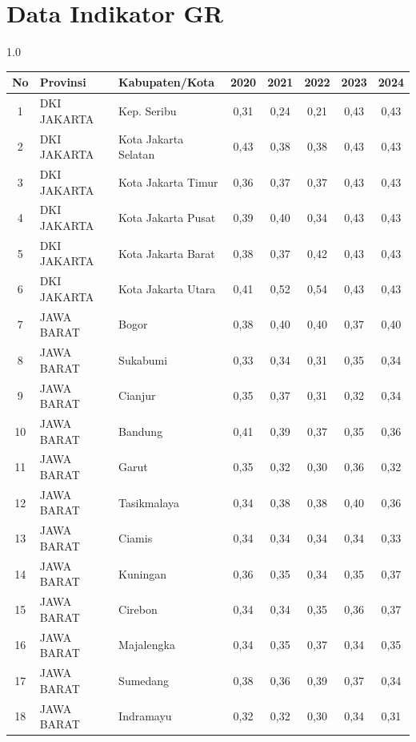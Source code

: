 \section*{Data Indikator GR}
\begin{spacing}{1.0}
\scriptsize
\setlength{\tabcolsep}{2pt}
\begin{longtable}{|c|p{2.2cm}|p{2.8cm}|c|c|c|c|c|}
\hline
\textbf{No} & \textbf{Provinsi} & \textbf{Kabupaten/Kota} & \textbf{2020} & \textbf{2021} & \textbf{2022} & \textbf{2023} & \textbf{2024} \\ \hline
\endhead
1 & DKI JAKARTA & Kep. Seribu & 0,31 & 0,24 & 0,21 & 0,43 & 0,43 \\ \hline
2 & DKI JAKARTA & Kota Jakarta Selatan & 0,43 & 0,38 & 0,38 & 0,43 & 0,43 \\ \hline
3 & DKI JAKARTA & Kota Jakarta Timur & 0,36 & 0,37 & 0,37 & 0,43 & 0,43 \\ \hline
4 & DKI JAKARTA & Kota Jakarta Pusat & 0,39 & 0,40 & 0,34 & 0,43 & 0,43 \\ \hline
5 & DKI JAKARTA & Kota Jakarta Barat & 0,38 & 0,37 & 0,42 & 0,43 & 0,43 \\ \hline
6 & DKI JAKARTA & Kota Jakarta Utara & 0,41 & 0,52 & 0,54 & 0,43 & 0,43 \\ \hline
7 & JAWA BARAT & Bogor & 0,38 & 0,40 & 0,40 & 0,37 & 0,40 \\ \hline
8 & JAWA BARAT & Sukabumi & 0,33 & 0,34 & 0,31 & 0,35 & 0,34 \\ \hline
9 & JAWA BARAT & Cianjur & 0,35 & 0,37 & 0,31 & 0,32 & 0,34 \\ \hline
10 & JAWA BARAT & Bandung & 0,41 & 0,39 & 0,37 & 0,35 & 0,36 \\ \hline
11 & JAWA BARAT & Garut & 0,35 & 0,32 & 0,30 & 0,36 & 0,32 \\ \hline
12 & JAWA BARAT & Tasikmalaya & 0,34 & 0,38 & 0,38 & 0,40 & 0,36 \\ \hline
13 & JAWA BARAT & Ciamis & 0,34 & 0,34 & 0,34 & 0,34 & 0,33 \\ \hline
14 & JAWA BARAT & Kuningan & 0,36 & 0,35 & 0,34 & 0,35 & 0,37 \\ \hline
15 & JAWA BARAT & Cirebon & 0,34 & 0,34 & 0,35 & 0,36 & 0,37 \\ \hline
16 & JAWA BARAT & Majalengka & 0,34 & 0,35 & 0,37 & 0,34 & 0,35 \\ \hline
17 & JAWA BARAT & Sumedang & 0,38 & 0,36 & 0,39 & 0,37 & 0,34 \\ \hline
18 & JAWA BARAT & Indramayu & 0,32 & 0,32 & 0,30 & 0,34 & 0,31 \\ \hline

\end{longtable}
\end{spacing}
